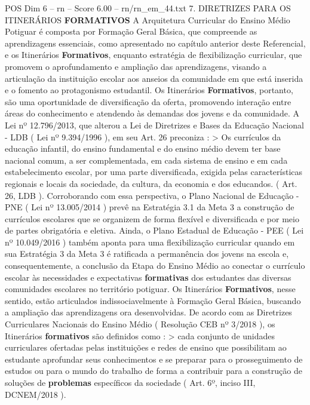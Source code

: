 \begin{textsample}{POS Dim 6 – rn – Score 6.00 – rn/rn\_em\_44.txt}  \label{ex:f6_pos_237}
7.
DIRETRIZES PARA OS ITINERÁRIOS \textbf{FORMATIVOS} A Arquitetura Curricular do Ensino Médio Potiguar é composta por Formação Geral Básica, que compreende as aprendizagens essenciais, como apresentado no capítulo anterior deste Referencial, e os Itinerários \textbf{Formativos}, enquanto estratégia de flexibilização curricular, que promovem o aprofundamento e ampliação das aprendizagens, visando a articulação da instituição escolar aos anseios da comunidade em que está inserida e o fomento ao protagonismo estudantil.
Os Itinerários \textbf{Formativos}, portanto, são uma oportunidade de diversificação da oferta, promovendo interação entre áreas do conhecimento e atendendo às demandas dos jovens e da comunidade.
A Lei nº 12.796/2013, que alterou a Lei de Diretrizes e Bases da Educação Nacional - LDB ( Lei nº 9.394/1996 ), em seu Art. 26 preconiza : > Os currículos da educação infantil, do ensino fundamental e do ensino médio devem ter base nacional comum, a ser complementada, em cada sistema de ensino e em cada estabelecimento escolar, por uma parte diversificada, exigida pelas características regionais e locais da sociedade, da cultura, da economia e dos educandos. ( Art. 26, LDB ).
Corroborando com essa perspectiva, o Plano Nacional de Educação - PNE ( Lei nº 13.005/2014 ) prevê na Estratégia 3.1 da Meta 3 a construção de currículos escolares que se organizem de forma flexível e diversificada e por meio de partes obrigatória e eletiva.
Ainda, o Plano Estadual de Educação - PEE ( Lei nº 10.049/2016 ) também aponta para uma flexibilização curricular quando em sua Estratégia 3 da Meta 3 é ratificada a permanência dos jovens na escola e, consequentemente, a conclusão da Etapa do Ensino Médio ao conectar o currículo escolar às necessidades e expectativas \textbf{formativas} dos estudantes das diversas comunidades escolares no território potiguar.
Os Itinerários \textbf{Formativos}, nesse sentido, estão articulados indissociavelmente à Formação Geral Básica, buscando a ampliação das aprendizagens ora desenvolvidas.
De acordo com as Diretrizes Curriculares Nacionais do Ensino Médio ( Resolução CEB nº 3/2018 ), os Itinerários \textbf{formativos} são definidos como : > cada conjunto de unidades curriculares ofertadas pelas instituições e redes de ensino que possibilitam ao estudante aprofundar seus conhecimentos e se preparar para o prosseguimento de estudos ou para o mundo do trabalho de forma a contribuir para a construção de soluções de \textbf{problemas} específicos da sociedade ( Art. 6º, inciso III, DCNEM/2018 ).

\end{textsample}

